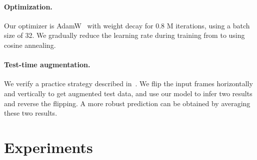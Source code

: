 \documentclass[10pt,twocolumn,letterpaper]{article}
\begin{document}
\paragraph{Optimization.} Our optimizer is AdamW~\cite{loshchilov2017decoupled}
with weight decay  for 0.8 M iterations, using a batch size of 32. We
gradually reduce the learning rate during training from  to
 using cosine annealing.


\paragraph{Test-time augmentation.} \label{subsubsec:test-aug} We verify a
practice strategy described in~\cite{huang2020rife}. We flip the input frames
horizontally and vertically to get augmented test data, and use our model to
infer two results and reverse the flipping. A more robust prediction can be
obtained by averaging these two results.



\section{Experiments}
\end{document}
